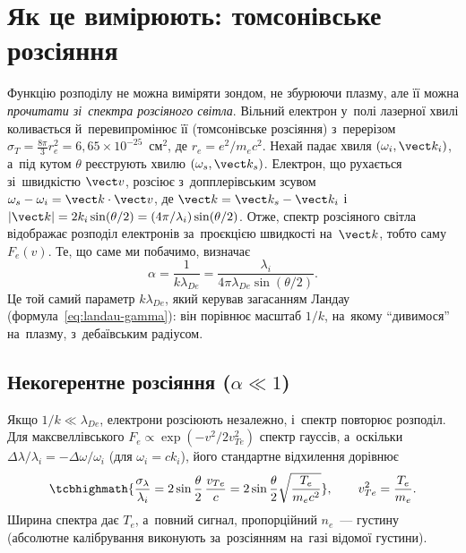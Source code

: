 \section{Як це вимірюють: томсонівське розсіяння}\label{sec:thomson}

Функцію розподілу не можна виміряти зондом, не збурюючи плазму, але її можна
\emph{прочитати зі~спектра розсіяного світла}. Вільний електрон у~полі лазерної хвилі
коливається й~перевипромінює її (томсонівське розсіяння) з~перерізом
$\sigma_T=\tfrac{8\pi}3r_e^2=6{,}65\times10^{-25}$~см$^2$, де $r_e=e^2/m_ec^2$.
Нехай падає хвиля $(\omega_i,\vect k_i)$, а~під кутом $\theta$ реєструють хвилю
$(\omega_s,\vect k_s)$. Електрон, що рухається зі~швидкістю $\vect v$, розсіює з~допплерівським
зсувом $\omega_s-\omega_i=\vect k\cdot\vect v$, де
$\vect k=\vect k_s-\vect k_i$ і~$|\vect k|=2k_i\sin(\theta/2)=(4\pi/\lambda_i)\sin(\theta/2)$.
Отже, спектр розсіяного світла відображає розподіл електронів за~проєкцією швидкості на~$\vect k$,
тобто саму $F_e(v)$. Те, що саме ми побачимо, визначає 
\begin{equation}\label{eq:scattering-parameter}
	\alpha=\frac1{k\lambda_{De}}=\frac{\lambda_i}{4\pi\lambda_{De}\sin(\theta/2)}.
\end{equation}
Це той самий параметр $k\lambda_{De}$, який керував загасанням Ландау
(формула~\eqref{eq:landau-gamma}): він порівнює масштаб $1/k$, на~якому \enquote{дивимося} на~плазму,
з~дебаївським радіусом.

\subsection*{Некогерентне розсіяння ($\alpha\ll1$)}
Якщо $1/k\ll\lambda_{De}$, електрони розсіюють незалежно, і~спектр повторює розподіл.
Для максвеллівського $F_e\propto\exp(-v^2/2v_{Te}^2)$ спектр гауссів, а~оскільки
$\Delta\lambda/\lambda_i=-\Delta\omega/\omega_i$ (для $\omega_i=ck_i$), його стандартне відхилення дорівнює
\begin{equation}\label{eq:thomson-width}
	\tcbhighmath{\frac{\sigma_\lambda}{\lambda_i}=2\sin\frac\theta2\,\frac{v_{Te}}{c}
	=2\sin\frac\theta2\sqrt{\frac{T_e}{m_ec^2}}},\qquad v_{Te}^2=\frac{T_e}{m_e}.
\end{equation}
Ширина спектра дає $T_e$, а~повний сигнал, пропорційний $n_e$~--- густину (абсолютне
калібрування виконують за~розсіянням на~газі відомої густини).

